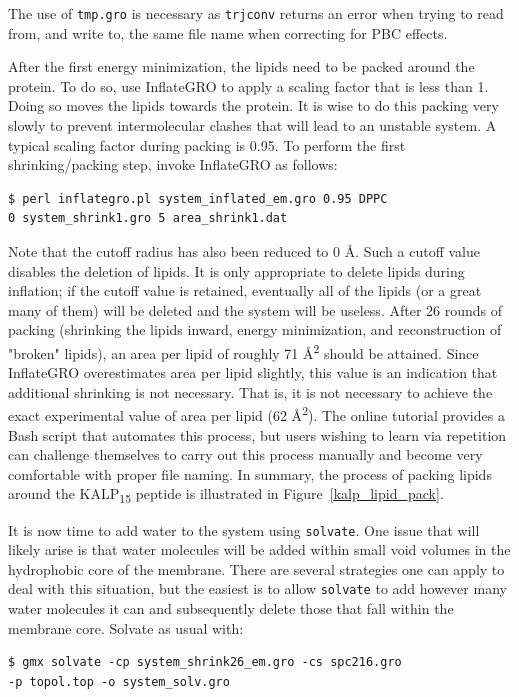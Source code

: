\documentclass[9pt,tutorial]{livecoms}
\begin{document}
The use of \texttt{tmp.gro} is necessary as \texttt{trjconv} returns an error when trying to read from, and write to, the same file name when correcting for PBC effects.

After the first energy minimization, the lipids need to be packed around the protein. To do so, use InflateGRO to apply a scaling factor that is less than 1. Doing so moves the lipids towards the protein. It is wise to do this packing very slowly to prevent intermolecular clashes that will lead to an unstable system. A typical scaling factor during packing is 0.95. To perform the first shrinking/packing step, invoke InflateGRO as follows:

\begin{verbatim}
$ perl inflategro.pl system_inflated_em.gro 0.95 DPPC 
0 system_shrink1.gro 5 area_shrink1.dat
\end{verbatim}

Note that the cutoff radius has also been reduced to 0 \AA. Such a cutoff value disables the deletion of lipids. It is only appropriate to delete lipids during inflation; if the cutoff value is retained, eventually all of the lipids (or a great many of them) will be deleted and the system will be useless. After 26 rounds of packing (shrinking the lipids inward, energy minimization, and reconstruction of "broken" lipids), an area per lipid of roughly 71 \AA\textsuperscript{2} should be attained. Since InflateGRO overestimates area per lipid slightly, this value is an indication that additional shrinking is not necessary. That is, it is not necessary to achieve the exact experimental value of area per lipid (62 \AA\textsuperscript{2}). The online tutorial provides a Bash script that automates this process, but users wishing to learn via repetition can challenge themselves to carry out this process manually and become very comfortable with proper file naming. In summary, the process of packing lipids around the KALP\textsubscript{15} peptide is illustrated in Figure~\ref{kalp_lipid_pack}.

It is now time to add water to the system using \texttt{solvate}. One issue that will likely arise is that water molecules will be added within small void volumes in the hydrophobic core of the membrane. There are several strategies one can apply to deal with this situation, but the easiest is to allow \texttt{solvate} to add however many water molecules it can and subsequently delete those that fall within the membrane core. Solvate as usual with:

\begin{verbatim}
$ gmx solvate -cp system_shrink26_em.gro -cs spc216.gro 
-p topol.top -o system_solv.gro
\end{verbatim}
\end{document}
